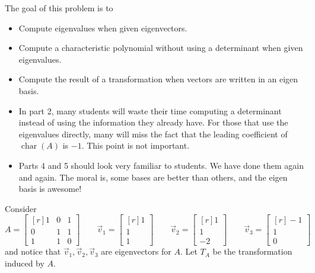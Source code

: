 \documentclass{problemset}
\DeclareMathOperator{\chr}{char}
\newcommand{\mat}[1]{\begin{bmatrix*}[r]#1\end{bmatrix*}}
\begin{document}
	\question
	\label{actingOnEigenvectors}
	\begin{annotation}
		\begin{goals}

			The goal of this problem is to
			\begin{itemize}
				\item Compute eigenvalues when given eigenvectors.
				\item Compute a characteristic polynomial without using a determinant
					when given eigenvalues.
				\item Compute the result of a transformation when vectors are written in an eigen basis.
			\end{itemize}
		\end{goals}

		\begin{notes}
			\begin{itemize}
				\item In part 2, many students will waste their time computing a determinant instead
					of using the information they already have. For those that use the eigenvalues
					directly, many will miss the fact that the leading coefficient of $\chr(A)$ is $-1$.
					This point is not important.
				\item Parts 4 and 5 should look very familiar to students. We have done them again and again.
					The moral is, some bases are better than others, and the eigen basis is awesome!
			\end{itemize}
		\end{notes}
	\end{annotation}
	Consider
	\[
		A=\mat{1&0&1\\0&1&1\\1&1&0}\qquad
		\vec v_1=\mat{1\\1\\1}\qquad
		\vec v_2=\mat{1\\1\\-2}\qquad
		\vec v_3=\mat{-1\\1\\0}
	\]
	and notice that $\vec v_1,\vec v_2,\vec v_3$ are eigenvectors for $A$. Let $T_A$ be the transformation induced by $A$.
\end{document}
